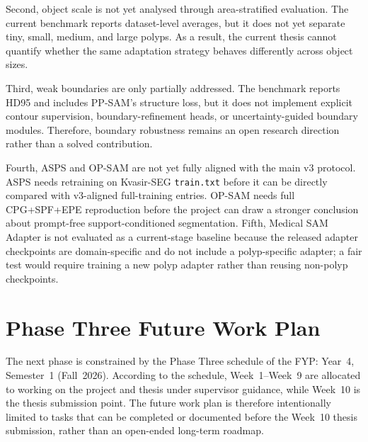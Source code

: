 Second, object scale is not yet analysed through area-stratified evaluation. The current benchmark reports dataset-level averages, but it does not yet separate tiny, small, medium, and large polyps. As a result, the current thesis cannot quantify whether the same adaptation strategy behaves differently across object sizes.

Third, weak boundaries are only partially addressed. The benchmark reports HD95 and includes PP-SAM's structure loss, but it does not implement explicit contour supervision, boundary-refinement heads, or uncertainty-guided boundary modules. Therefore, boundary robustness remains an open research direction rather than a solved contribution.

Fourth, ASPS and OP-SAM are not yet fully aligned with the main v3 protocol. ASPS needs retraining on Kvasir-SEG \texttt{train.txt} before it can be directly compared with v3-aligned full-training entries. OP-SAM needs full CPG+SPF+EPE reproduction before the project can draw a stronger conclusion about prompt-free support-conditioned segmentation. Fifth, Medical SAM Adapter is not evaluated as a current-stage baseline because the released adapter checkpoints are domain-specific and do not include a polyp-specific adapter; a fair test would require training a new polyp adapter rather than reusing non-polyp checkpoints.

\section{Phase Three Future Work Plan}
\label{sec:future-work-plan}

The next phase is constrained by the Phase Three schedule of the FYP: Year~4, Semester~1 (Fall~2026). According to the schedule, Week~1--Week~9 are allocated to working on the project and thesis under supervisor guidance, while Week~10 is the thesis submission point. The future work plan is therefore intentionally limited to tasks that can be completed or documented before the Week~10 thesis submission, rather than an open-ended long-term roadmap.

